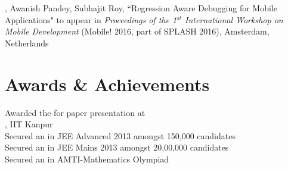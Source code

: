 \documentclass[mm]{simple_style}
\begin{document}
\begin{resume}
, Awanish Pandey, Subhajit Roy, ``Regression Aware Debugging for Mobile Applications" to appear in \textit{Proceedings of the 1$^{st}$ International Workshop on Mobile Development} (Mobile! 2016, part of SPLASH 2016), Amsterdam, Netherlands

\vspace{-2ex}
\sectionline
\section{Awards \& Achievements}
Awarded the  for paper presentation at \\
, IIT Kanpur\\
Secured an  in JEE Advanced 2013 amongst 150,000 candidates\\
Secured an  in JEE Mains 2013 amongst 20,00,000 candidates\\
Secured an  in AMTI-Mathematics Olympiad

\vspace{-2ex}
\sectionline


\end{resume}
\end{document}

